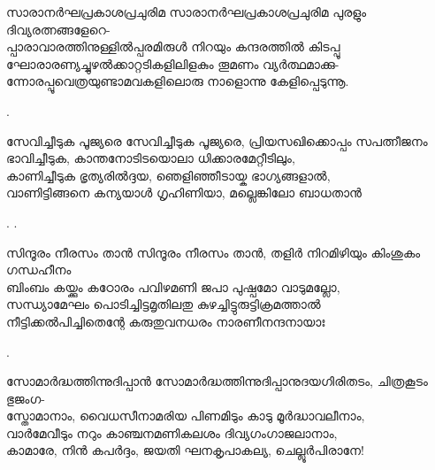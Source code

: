 \begin{enumerate}

\begin{slokam}{\VSr}{\VCBP}{സാരാനർഘപ്രകാശപ്രചുരിമ}
 സാരാനർഘപ്രകാശപ്രചുരിമ പുരളും ദിവ്യരത്നങ്ങളേറെ-\\
പ്പാരാവാരത്തിനുള്ളിൽപ്പരമിരുള്‍ നിറയും കന്ദരത്തിൽ കിടപ്പൂ\\
ഘോരാരണ്യച്ചുഴൽക്കാറ്റടികളിലിളകും തൂമണം വ്യർത്ഥമാക്കു-\\
ന്നോരപ്പൂവെത്രയുണ്ടാമവകളിലൊരു നാളൊന്നു കേളിപ്പെടുന്നൂ.
\end{slokam}


.

\begin{slokam}{\VSv}{\ARRV}{സേവിച്ചീടുക പൂജ്യരെ}
 സേവിച്ചീടുക പൂജ്യരെ, പ്രിയസഖിക്കൊപ്പം സപത്നീജനം\\
ഭാവിച്ചീടുക, കാന്തനോടിടയൊലാ ധിക്കാരമേറ്റീടിലും,\\
കാണിച്ചീടുക ഭൃത്യരില്‍ദ്ദയ, ഞെളിഞ്ഞീടായ്ക ഭാഗ്യങ്ങളാല്‍,\\
വാണിട്ടിങ്ങനെ കന്യയാള്‍ ഗൃഹിണിയാ, മല്ലെങ്കിലോ ബാധതാന്‍
\end{slokam}


.  .


\begin{slokam}{\VSr}{\Unk}{സിന്ദൂരം നീരസം താൻ}
സിന്ദൂരം നീരസം താൻ, തളിർ നിറമിഴിയും കിംശുകം ഗന്ധഹീനം \\
ബിംബം കയ്ക്കും കഠോരം പവിഴമണി ജപാ പുഷ്പമോ വാടുമല്ലോ,\\
സന്ധ്യാമേഘം പൊടിച്ചിട്ടമൃതിലതു കുഴച്ചിട്ടുരുട്ടിക്രമത്താൽ\\
നീട്ടിക്കൽപിച്ചിതെന്റേ കരുതുവനധരം നാരണീനന്ദനായാഃ
\end{slokam}


.

\begin{slokam}{\VSr}{\Unk}{സോമാര്‍ദ്ധത്തിന്നുദിപ്പാൻ}
സോമാര്‍ദ്ധത്തിന്നുദിപ്പാനുദയഗിരിതടം, ചിത്രകൂടം ഭുജംഗ-\\
സ്തോമാനാം, വൈധസീനാമരിയ പിണമിടും കാടു മൂര്‍ദ്ധാവലീനാം,\\
വാര്‍മേവീടും നറും കാഞ്ചനമണികലശം ദിവ്യഗംഗാജലാനാം,\\
കാമാരേ, നിന്‍ കപര്‍ദ്ദം, ജയതി ഘനകൃപാകല്യ, ചെല്ലൂര്‍പിരാനേ!
\end{slokam}





\end{enumerate}
